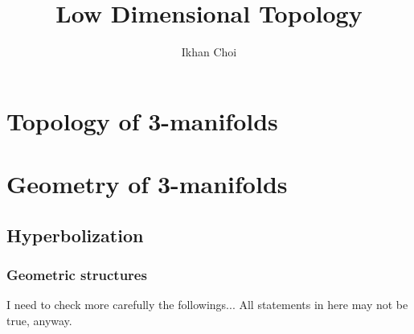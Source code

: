 \documentclass{../note}
\begin{document}
\title{Low Dimensional Topology}
\author{Ikhan Choi}
\maketitle
\tableofcontents

\part{Topology of 3-manifolds}
\chapter{}
\chapter{}
\chapter{}


\part{Geometry of 3-manifolds}
\chapter{Hyperbolization}
\section{Geometric structures}

I need to check more carefully the followings...
All statements in here may not be true, anyway.
\end{document}
